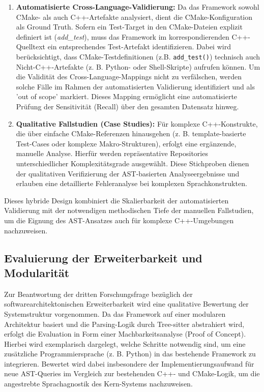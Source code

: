 \documentclass[12pt,titlepage]{article}
\begin{document}
\begin{enumerate}
    \item \textbf{Automatisierte Cross-Language-Validierung:} 
    Da das Framework sowohl CMake- als auch C++-Artefakte analysiert, dient die CMake-Konfiguration als Ground Truth. Sofern ein Test-Target in den CMake-Dateien explizit definiert ist (\textit{add\_test}), muss das Framework im korrespondierenden C++-Quelltext ein entsprechendes Test-Artefakt identifizieren. Dabei wird berücksichtigt, dass CMake-Testdefinitionen (z.B. \verb|add_test()|) technisch auch Nicht-C++-Artefakte (z. B. Python- oder Shell-Skripte) aufrufen können. Um die Validität des Cross-Language-Mappings nicht zu verfälschen, werden solche Fälle im Rahmen der automatisierten Validierung identifiziert und als 'out of scope' markiert. Dieses Mapping ermöglicht eine automatisierte Prüfung der Sensitivität (Recall) über den gesamten Datensatz hinweg.    
    \item \textbf{Qualitative Fallstudien (Case Studies):} 
    Für komplexe C++-Konstrukte, die über einfache CMake-Referenzen hinausgehen (z. B. template-basierte Test-Cases oder komplexe Makro-Strukturen), erfolgt eine ergänzende, manuelle Analyse. Hierfür werden repräsentative Repositories unterschiedlicher Komplexitätsgrade ausgewählt. Diese Stichproben dienen der qualitativen Verifizierung der AST-basierten Analyseergebnisse und erlauben eine detaillierte Fehleranalyse bei komplexen Sprachkonstrukten.
\end{enumerate}

Dieses hybride Design kombiniert die Skalierbarkeit der automatisierten Validierung mit der notwendigen methodischen Tiefe der manuellen Fallstudien, um die Eignung des AST-Ansatzes auch für komplexe C++-Umgebungen nachzuweisen.


\subsection{Evaluierung der Erweiterbarkeit und Modularität}

Zur Beantwortung der dritten Forschungsfrage bezüglich der softwarearchitektonischen Erweiterbarkeit  wird eine qualitative Bewertung der Systemstruktur vorgenommen. Da das Framework auf einer modularen Architektur basiert und die Parsing-Logik durch Tree-sitter  abstrahiert wird, erfolgt die Evaluation in Form einer Machbarkeitsanalyse (Proof of Concept). Hierbei wird exemplarisch dargelegt, welche Schritte notwendig sind, um eine zusätzliche Programmiersprache (z. B. Python) in das bestehende Framework zu integrieren. Bewertet wird dabei insbesondere der Implementierungsaufwand für neue AST-Queries im Vergleich zur bestehenden C++- und CMake-Logik, um die angestrebte Sprachagnostik des Kern-Systems nachzuweisen.
\newpage


\end{document}

